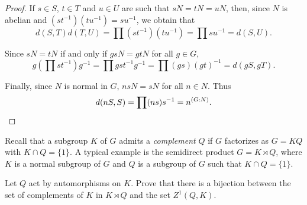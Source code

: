 \begin{proof}
	If $s\in S$, $t\in T$ and $u\in U$ are such that $sN=tN=uN$, then, since $N$ is 
	abelian and $(st^{-1})(tu^{-1})=su^{-1}$, we obtain that 
	\[
		d(S,T)d(T,U)=\prod (st^{-1})(tu^{-1})=\prod su^{-1}=d(S,U).
	\]

	Since $sN=tN$ if and only if $gsN=gtN$ for all $g\in G$, 
	\[
	g\left(\prod st^{-1}\right)g^{-1}=\prod gst^{-1}g^{-1}=\prod (gs)(gt)^{-1}=d(gS,gT).
	\]

	Finally, since $N$ is normal in $G$, $nsN=sN$ for all $n\in N$. Thus 
	\[
		d(nS,S)=\prod (ns)s^{-1}=n^{(G:N)}.\qedhere
	\]
\end{proof}

Recall that a subgroup $K$ of $G$ admits a \emph{complement} $Q$ 
if $G$ factorizes as 
$G=KQ$ with $K\cap Q=\{1\}$. 
A typical example is the semidirect product $G=K\rtimes Q$, where $K$ is a normal subgroup of 
$G$ and $Q$ is a subgroup of $G$ such that $K\cap Q=\{1\}$. 

\begin{exercise}
\label{xca:complementos}
Let $Q$ act by automorphisms on $K$. Prove that there is a bijection 
between the set of complements of $K$ in $K\rtimes Q$ and the set 
$Z^1(Q,K)$.
\end{exercise}

	
	

